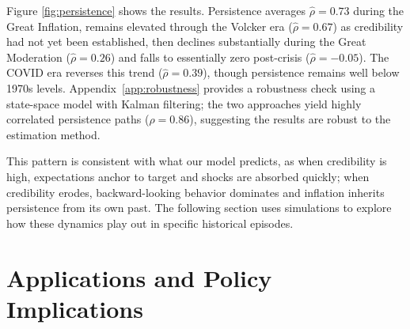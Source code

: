 \documentclass[10pt]{article}
\begin{document}
Figure \ref{fig:persistence} shows the results. Persistence averages $\hat{\rho} = 0.73$ during the Great Inflation, remains elevated through the Volcker era ($\hat{\rho} = 0.67$) as credibility had not yet been established, then declines substantially during the Great Moderation ($\hat{\rho} = 0.26$) and falls to essentially zero post-crisis ($\hat{\rho} = -0.05$). The COVID era reverses this trend ($\hat{\rho} = 0.39$), though persistence remains well below 1970s levels. Appendix~\ref{app:robustness} provides a robustness check using a state-space model with Kalman filtering; the two approaches yield highly correlated persistence paths ($\rho = 0.86$), suggesting the results are robust to the estimation method.

This pattern is consistent with what our model predicts, as when credibility is high, expectations anchor to target and shocks are absorbed quickly; when credibility erodes, backward-looking behavior dominates and inflation inherits persistence from its own past. The following section uses simulations to explore how these dynamics play out in specific historical episodes.



\section{Applications and Policy Implications}
\label{sec:applications}
\end{document}
